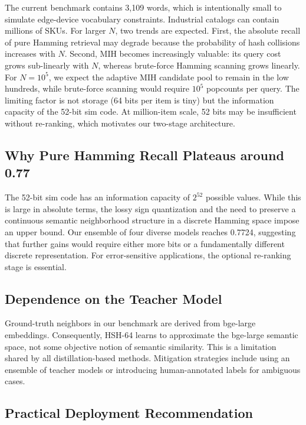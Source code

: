 \documentclass[11pt,a4paper]{article}
\begin{document}
The current benchmark contains 3,109 words, which is intentionally small to simulate edge-device vocabulary constraints. Industrial catalogs can contain millions of SKUs. For larger $N$, two trends are expected. First, the absolute recall of pure Hamming retrieval may degrade because the probability of hash collisions increases with $N$. Second, MIH becomes increasingly valuable: its query cost grows sub-linearly with $N$, whereas brute-force Hamming scanning grows linearly. For $N=10^5$, we expect the adaptive MIH candidate pool to remain in the low hundreds, while brute-force scanning would require $10^5$ popcounts per query. The limiting factor is not storage (64 bits per item is tiny) but the information capacity of the 52-bit sim code. At million-item scale, 52 bits may be insufficient without re-ranking, which motivates our two-stage architecture.

\subsection{Why Pure Hamming Recall Plateaus around 0.77}

The 52-bit sim code has an information capacity of $2^{52}$ possible values. While this is large in absolute terms, the lossy sign quantization and the need to preserve a continuous semantic neighborhood structure in a discrete Hamming space impose an upper bound. Our ensemble of four diverse models reaches 0.7724, suggesting that further gains would require either more bits or a fundamentally different discrete representation. For error-sensitive applications, the optional re-ranking stage is essential.

\subsection{Dependence on the Teacher Model}

Ground-truth neighbors in our benchmark are derived from bge-large embeddings. Consequently, HSH-64 learns to approximate the bge-large semantic space, not some objective notion of semantic similarity. This is a limitation shared by all distillation-based methods. Mitigation strategies include using an ensemble of teacher models or introducing human-annotated labels for ambiguous cases.

\subsection{Practical Deployment Recommendation}
\end{document}
